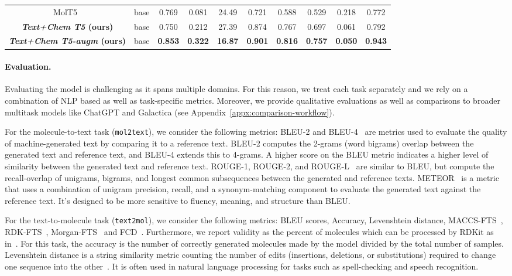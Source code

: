 \documentclass[nohyperref]{article}
\theoremstyle{plain}
\theoremstyle{definition}
\theoremstyle{remark}
\begin{document}
\begin{table*}[ht]
{\begin{tabular}{cc | cccccccc}
    MolT5~\citep{edwards2022translation} & base & 0.769 & 0.081 & 24.49 & 0.721 & 0.588 & 0.529 & 0.218 & 0.772\\
    \textbf{\emph{Text+Chem T5}  (ours)} & base & 0.750 & 0.212 & 27.39 & 0.874 & 0.767 & 0.697 & 0.061 & 0.792 \\
    \textbf{\emph{Text+Chem T5-augm} (ours)} & base & \textbf{0.853} & \textbf{0.322} & \textbf{16.87} & \textbf{0.901} & \textbf{0.816} & \textbf{0.757} & \textbf{0.050} & \textbf{0.943} \\
    \bottomrule
    \end{tabular}
    }
    \label{tab:experiments-text-smiles}
\end{table*}


\paragraph{Evaluation.}
Evaluating the model is challenging as it spans multiple domains. For this reason, we treat each task separately and we rely on a combination of NLP based as well as task-specific metrics.
Moreover, we provide qualitative evaluations as well as comparisons to broader multitask models like ChatGPT and Galactica (see Appendix~\ref{appx:comparison-workflow}).

For the molecule-to-text task (\texttt{mol2text}), we consider the following metrics:
BLEU-2 and BLEU-4~\citep{papineni2002bleu} are metrics used to evaluate the quality of machine-generated text by comparing it to a reference text. BLEU-2 computes the 2-grams (word bigrams) overlap between the generated text and reference text, and BLEU-4 extends this to 4-grams. A higher score on the BLEU metric indicates a higher level of similarity between the generated text and reference text.
ROUGE-1, ROUGE-2, and ROUGE-L~\citep{lin2004rouge} are similar to BLEU, but compute the recall-overlap of unigrams, bigrams, and longest common subsequences between the generated and reference texts.
METEOR~\citep{banerjee-lavie-2005-meteor} is a metric that uses a combination of unigram precision, recall, and a synonym-matching component to evaluate the generated text against the reference text.
It's designed to be more sensitive to fluency, meaning, and structure than BLEU.

For the text-to-molecule task (\texttt{text2mol}), we consider the following metrics:
BLEU scores, Accuracy, Levenshtein distance, MACCS-FTS~\citep{durant2002reoptimization}, RDK-FTS~\citep{tanimoto1958}, Morgan-FTS~\citep{rogers2010extended} and FCD~\citep{preuer2018frechet}. Furthermore, we report validity as the percent of molecules which can be processed by RDKit as in~\citet{ edwards2022translation}.
For this task, the accuracy is the number of correctly generated molecules made by the model divided by the total number of samples.
Levenshtein distance is a string similarity metric counting the number of edits (insertions, deletions, or substitutions) required to change one sequence into the other~\citep{levenshtein1966binary}. 
It is often used in natural language processing for tasks such as spell-checking and speech recognition.
\end{document}

